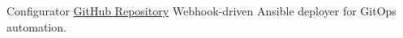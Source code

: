 
\begin{cventries}

	\cvproject
	{Configurator} %
	{\href{https://github.com/GabrieleBocchi/configurator}{GitHub Repository}} %
	{Webhook-driven Ansible deployer for GitOps automation.} %

\end{cventries}
